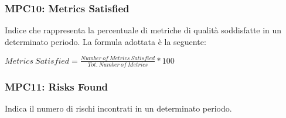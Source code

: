\subsubsection{MPC10: Metrics Satisfied}\label{sssec:metrics_satisfied}
Indice che rappresenta la percentuale di metriche di qualità soddisfatte in un determinato periodo.
La formula adottata è la seguente:
\begin{center}
    $Metrics\ Satisfied = \displaystyle \frac{Number\ of\ Metrics\ Satisfied}{Tot.\ Number\ of\ Metrics}*100$
\end{center}

\subsubsection{MPC11: Risks Found}\label{sssec:risks_found}
Indica il numero di rischi incontrati in un determinato periodo.